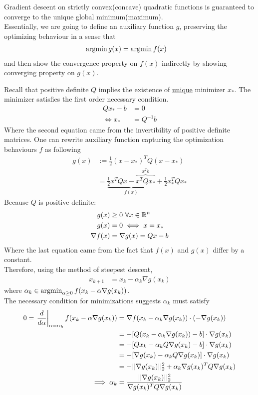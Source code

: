 \documentclass{article}
\begin{document}
	\begin{theorem}
		Gradient descent on  strictly convex(concave) quadratic functions is guaranteed to converge to the unique global minimum(maximum). \\
		Essentially, we are going to define an auxiliary function $g$, preserving the optimizing behaviour in a sense that
		\begin{align}
			\operatorname*{argmin} g(x) &= \operatorname*{argmin} f(x)
		\end{align}
		and then show the convergence property on $f(x)$ indirectly by showing converging property on $g(x)$.
	\end{theorem}
	
	\begin{lemma}
		Recall that positive definite $Q$ implies the existence of \ul{unique} minimizer $x_*$. The minimizer satisfies the first order necessary condition.
		\begin{align}
			Q x_* - b &= 0 \\
			\iff x_* &= Q^{-1} b
		\end{align}
		Where the second equation came from the invertibility of positive definite matrices.
		One can rewrite auxiliary function capturing the optimization behaviours $f$ as following 
		\begin{align}
			g(x) &:= \frac{1}{2} (x - x_*)^T Q (x - x_*) \\
			&= \underbrace{\frac{1}{2} x^T Q x - \overbrace{x^T Q x_*}^{x^T b}}_{f(x)} + \frac{1}{2} x_*^T Q x_*
		\end{align}
		Because $Q$ is positive definite:
		\begin{align}
			g(x) &\geq 0\ \forall x \in \mathbb{R}^n \\
			g(x) &= 0 \iff x = x_*\\
			\nabla f(x) &= \nabla g(x) = Q x - b
		\end{align}
		Where the last equation came from the fact that $f(x)$ and $g(x)$ differ by a constant.\\
		Therefore, using the method of steepest descent,
		\begin{align}
			x_{k+1} &= x_k - \alpha_k \nabla g(x_k)
		\end{align}
		where $\alpha_k \in \operatorname*{argmin}_{\alpha \geq 0}f(x_k - \alpha \nabla g(x_k))$. \\
		The necessary condition for minimizations suggests $\alpha_k$ must satisfy
		\begin{align}
			0 = \left. \frac{d}{d\alpha}\right|_{\alpha = \alpha_k} f(x_k - \alpha \nabla g(x_k)) 
			&= \nabla f(x_k - \alpha_k \nabla g(x_k)) \cdot (-\nabla g(x_k))\\
			&= - [Q(x_k - \alpha_k \nabla g(x_k)) - b] \cdot \nabla g(x_k) \\
			&= - [Qx_k - \alpha_k Q \nabla g(x_k) - b] \cdot \nabla g(x_k) \\
			&= - [\nabla g(x_k) - \alpha_k Q \nabla g(x_k)] \cdot \nabla g(x_k) \\
			&= - \vert \vert {\nabla g(x_k)} \vert \vert_2^2 + \alpha_k \nabla g(x_k)^T Q \nabla g(x_k) \\
			\implies \alpha_k &= \frac{\vert \vert {\nabla g(x_k)} \vert \vert_2^2}{\nabla g(x_k)^T Q \nabla g(x_k)}
		\end{align}
	\end{lemma}
	
\end{document}
